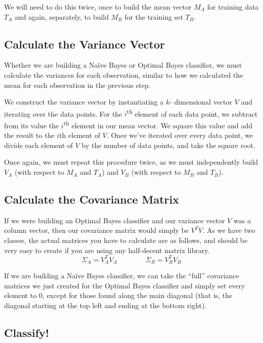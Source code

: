 \documentclass{article}
\begin{document}
We will need to do this twice, once to build the mean vector $M_A$ for training
data $T_A$ and again, separately, to build $M_B$ for the training set $T_B$.

\subsection{Calculate the Variance Vector}

Whether we are building a Na\"ive Bayes or Optimal Bayes classifier, we must
calculate the variances for each observation, similar to how we calculated
the mean for each observation in the previous step.

We construct the variance vector by instantiating a $k$- dimensional vector $V$
and iterating over the data points.  For the $i$\textsuperscript{th} element of each data
point, we subtract from its value the $i$\textsuperscript{th} element in our mean
vector.  We square this value and add the result to the $i$th element
of $V$.  Once we've iterated over every data point, we divide each
element of $V$ by the number of data points, and take the square root.

Once again, we must repeat this procedure twice, as we must independently build
$V_A$ (with respect to $M_A$ and $T_A$) and $V_B$ (with respect to $M_B$
and $T_B$).

\subsection{Calculate the Covariance Matrix}

If we were building an Optimal Bayes classifier and our variance vector $V$ was
a column vector, then our covariance matrix would simply be $V^TV$. As we have
two classes, the actual matrices you have to calculate are as follows, and
should be very easy to create if you are using any half-decent matrix library.
\[
\Sigma_A = V_A^TV_A \qquad \qquad \Sigma_B = V_B^TV_B
\]

If we are building a Na\"ive Bayes classifier, we can take the ``full''
covariance matrices we just created for the Optimal Bayes classifier and simply
set every element to $0$, except for those found along the main diagonal (that
is, the diagonal starting at the top left and ending at the bottom right).

\subsection{Classify!}
\end{document}
